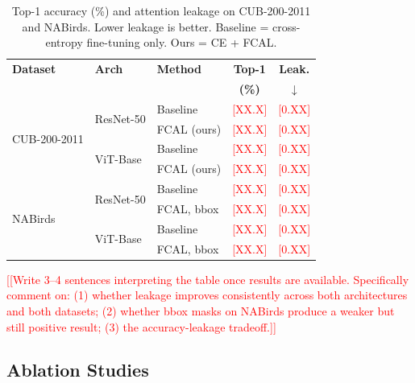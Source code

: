 \documentclass[journal]{IEEEtran}
\newcommand{\ph}[1]{\textcolor{red}{[#1]}}
\begin{document}
\begin{table}[htbp]
  \centering
  \caption{Top-1 accuracy (\%) and attention leakage on
           CUB-200-2011 and NABirds.
           Lower leakage is better.
           Baseline = cross-entropy fine-tuning only.
           Ours = CE + FCAL.}
  \label{tab:main}
  \renewcommand{\arraystretch}{1.2}
  \setlength{\tabcolsep}{4pt}
  \begin{tabular}{@{}p{1.5cm} p{1.5cm} p{1.7cm} c c@{}}
    \toprule
    \textbf{Dataset} & \textbf{Arch} & \textbf{Method}
      & \textbf{Top-1} & \textbf{Leak.} \\
      & & & \textbf{(\%)} & $\downarrow$ \\
    \midrule
    \multirow{4}{1.5cm}{CUB-200-2011}
      & \multirow{2}{1.5cm}{ResNet-50}
        & Baseline        & \ph{XX.X} & \ph{0.XX} \\
      & & FCAL (ours)     & \ph{XX.X} & \ph{0.XX} \\
      \cmidrule{2-5}
      & \multirow{2}{1.5cm}{ViT-Base}
        & Baseline        & \ph{XX.X} & \ph{0.XX} \\
      & & FCAL (ours)     & \ph{XX.X} & \ph{0.XX} \\
    \midrule
    \multirow{4}{1.5cm}{NABirds}
      & \multirow{2}{1.5cm}{ResNet-50}
        & Baseline        & \ph{XX.X} & \ph{0.XX} \\
      & & FCAL, bbox      & \ph{XX.X} & \ph{0.XX} \\
      \cmidrule{2-5}
      & \multirow{2}{1.5cm}{ViT-Base}
        & Baseline        & \ph{XX.X} & \ph{0.XX} \\
      & & FCAL, bbox      & \ph{XX.X} & \ph{0.XX} \\
    \bottomrule
  \end{tabular}
\end{table}

\ph{[Write 3--4 sentences interpreting the table once results are
available. Specifically comment on: (1) whether leakage improves
consistently across both architectures and both datasets; (2)
whether bbox masks on NABirds produce a weaker but still positive
result; (3) the accuracy-leakage tradeoff.]}

\subsection{Ablation Studies}
\end{document}
